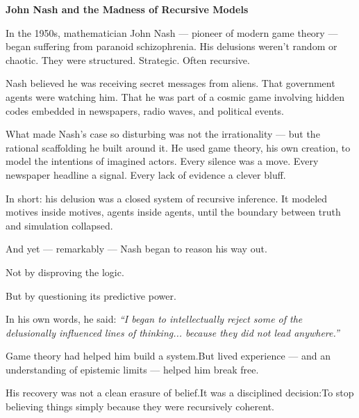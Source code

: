 \begin{HistoricalSidebar}{\textbf{John Nash and the Madness of Recursive Models}}

  In the 1950s, mathematician John Nash — pioneer of modern game theory — began suffering from
  paranoid schizophrenia. His delusions weren’t random or chaotic. They were structured.
  Strategic. Often recursive.
  
  \medskip
  
  Nash believed he was receiving secret messages from aliens. That government agents were watching
  him. That he was part of a cosmic game involving hidden codes embedded in newspapers, radio waves,
  and political events.
  
  \medskip
  
  What made Nash’s case so disturbing was not the irrationality — but the rational scaffolding he
  built around it. He used game theory, his own creation, to model the intentions of imagined actors.
  Every silence was a move. Every newspaper headline a signal. Every lack of evidence a clever bluff.
  
  \medskip
  
  In short: his delusion was a closed system of recursive inference. It modeled motives inside
  motives, agents inside agents, until the boundary between truth and simulation collapsed.
  
  \medskip
  
  And yet — remarkably — Nash began to reason his way out.
  
  \medskip
  
  Not by disproving the logic.
  
  \medskip
  
  But by questioning its predictive power.
  
  \medskip
  
  In his own words, he said:
  \textit{``I began to intellectually reject some of the delusionally influenced lines of thinking...
  because they did not lead anywhere.''}
  
  \medskip
  
  Game theory had helped him build a system.But lived experience — and an understanding of epistemic limits — helped him break free.
  
  \medskip
  
  His recovery was not a clean erasure of belief.It was a disciplined decision:To stop believing things simply because they were recursively coherent.
  
  \medskip
  

\end{HistoricalSidebar}
